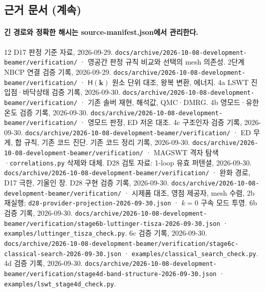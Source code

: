 \subsection{근거 문서 (계속)}\label{sources-continued}
\begingroup%
  \framesubtitle{긴 경로와 정확한 해시는 source-manifest.json에서 관리한다.}
  \small
  \begin{thebibliography}{12}
    \setcounter{enumiv}{10}
      D17 판정 기준 자료, 2026-09-29.
      \newblock \texttt{docs/archive/2026-10-08-development-beamer/verification/} · 영공간 판정 규칙 비교와 선택의 mesh 의존성.
      2단계 NBCP 연결 검증 기록, 2026-09-29.
      \newblock \texttt{docs/archive/2026-10-08-development-beamer/verification/} · $\mathsf H(\mathbf k)$ 원소 단위 대조, 왕복 변환, 에너지.
      4a LSWT 진입점·바닥상태 검증 기록, 2026-09-30.
      \newblock \texttt{docs/archive/2026-10-08-development-beamer/verification/} · 기존 솔버 재현, 해석값, QMC·DMRG.
      4b 영모드·유한 온도 검증 기록, 2026-09-30.
      \newblock \texttt{docs/archive/2026-10-08-development-beamer/verification/} · 영모드 판정, ED 저온 대조.
      4c 구조인자 검증 기록, 2026-09-30.
      \newblock \texttt{docs/archive/2026-10-08-development-beamer/verification/} · ED 무게, 합 규칙, 기존 코드 진단.
      기존 코드 정리 기록, 2026-09-30.
      \newblock \texttt{docs/archive/2026-10-08-development-beamer/verification/} · MAGSWT 격자 탐색·\texttt{correlations.py} 삭제와 대체.
      D28 검토 자료: 1-loop 유효 퍼텐셜, 2026-09-30.
      \newblock \texttt{docs/archive/2026-10-08-development-beamer/verification/} · 완화 경로, D17 극한, 기울인 장.
      D28 구현 검증 기록, 2026-09-30.
      \newblock \texttt{docs/archive/2026-10-08-development-beamer/verification/} · 시제품 대조, 영점 제공자, mesh 수렴, 2b 재실행; \texttt{d28-provider-projection-2026-09-30.json} · $k=0$ 구속 모드 투영.
      6b 검증 기록, 2026-09-30.
      \newblock \texttt{docs/archive/2026-10-08-development-beamer/verification/stage6b-luttinger-tisza-2026-09-30.json} · \texttt{examples/luttinger\_tisza\_check.py}.
      6c 검증 기록, 2026-09-30.
      \newblock \texttt{docs/archive/2026-10-08-development-beamer/verification/stage6c-classical-search-2026-09-30.json} · \texttt{examples/classical\_search\_check.py}.
      4d 검증 기록, 2026-09-30.
      \newblock \texttt{docs/archive/2026-10-08-development-beamer/verification/stage4d-band-structure-2026-09-30.json} · \texttt{examples/lswt\_stage4d\_check.py}.

\end{thebibliography}
